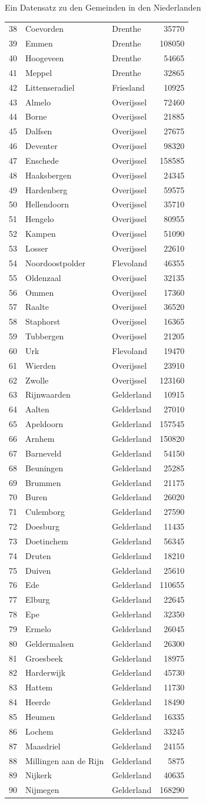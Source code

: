 \documentclass[ignorenonframetext,]{beamer}
\begin{document}
\begin{frame}[fragile]{Ein Datensatz zu den Gemeinden in den
Niederlanden}
\begin{longtable}[]{@{}lllr@{}}
38 & Coevorden & Drenthe & 35770\tabularnewline
39 & Emmen & Drenthe & 108050\tabularnewline
40 & Hoogeveen & Drenthe & 54665\tabularnewline
41 & Meppel & Drenthe & 32865\tabularnewline
42 & Littenseradiel & Friesland & 10925\tabularnewline
43 & Almelo & Overijssel & 72460\tabularnewline
44 & Borne & Overijssel & 21885\tabularnewline
45 & Dalfsen & Overijssel & 27675\tabularnewline
46 & Deventer & Overijssel & 98320\tabularnewline
47 & Enschede & Overijssel & 158585\tabularnewline
48 & Haaksbergen & Overijssel & 24345\tabularnewline
49 & Hardenberg & Overijssel & 59575\tabularnewline
50 & Hellendoorn & Overijssel & 35710\tabularnewline
51 & Hengelo & Overijssel & 80955\tabularnewline
52 & Kampen & Overijssel & 51090\tabularnewline
53 & Losser & Overijssel & 22610\tabularnewline
54 & Noordoostpolder & Flevoland & 46355\tabularnewline
55 & Oldenzaal & Overijssel & 32135\tabularnewline
56 & Ommen & Overijssel & 17360\tabularnewline
57 & Raalte & Overijssel & 36520\tabularnewline
58 & Staphorst & Overijssel & 16365\tabularnewline
59 & Tubbergen & Overijssel & 21205\tabularnewline
60 & Urk & Flevoland & 19470\tabularnewline
61 & Wierden & Overijssel & 23910\tabularnewline
62 & Zwolle & Overijssel & 123160\tabularnewline
63 & Rijnwaarden & Gelderland & 10915\tabularnewline
64 & Aalten & Gelderland & 27010\tabularnewline
65 & Apeldoorn & Gelderland & 157545\tabularnewline
66 & Arnhem & Gelderland & 150820\tabularnewline
67 & Barneveld & Gelderland & 54150\tabularnewline
68 & Beuningen & Gelderland & 25285\tabularnewline
69 & Brummen & Gelderland & 21175\tabularnewline
70 & Buren & Gelderland & 26020\tabularnewline
71 & Culemborg & Gelderland & 27590\tabularnewline
72 & Doesburg & Gelderland & 11435\tabularnewline
73 & Doetinchem & Gelderland & 56345\tabularnewline
74 & Druten & Gelderland & 18210\tabularnewline
75 & Duiven & Gelderland & 25610\tabularnewline
76 & Ede & Gelderland & 110655\tabularnewline
77 & Elburg & Gelderland & 22645\tabularnewline
78 & Epe & Gelderland & 32350\tabularnewline
79 & Ermelo & Gelderland & 26045\tabularnewline
80 & Geldermalsen & Gelderland & 26300\tabularnewline
81 & Groesbeek & Gelderland & 18975\tabularnewline
82 & Harderwijk & Gelderland & 45730\tabularnewline
83 & Hattem & Gelderland & 11730\tabularnewline
84 & Heerde & Gelderland & 18490\tabularnewline
85 & Heumen & Gelderland & 16335\tabularnewline
86 & Lochem & Gelderland & 33245\tabularnewline
87 & Maasdriel & Gelderland & 24155\tabularnewline
88 & Millingen aan de Rijn & Gelderland & 5875\tabularnewline
89 & Nijkerk & Gelderland & 40635\tabularnewline
90 & Nijmegen & Gelderland & 168290\tabularnewline

\end{longtable}
\end{frame}
\end{document}
